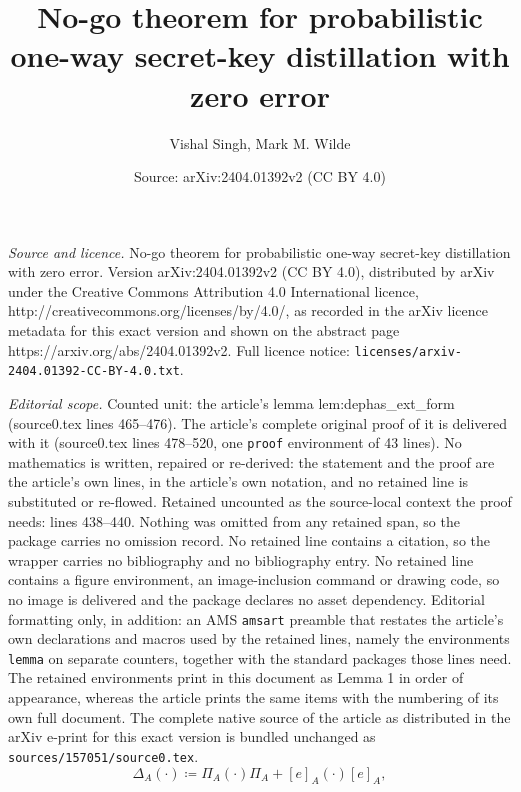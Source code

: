 \documentclass[10pt,a4paper]{amsart}
\title{No-go theorem for probabilistic one-way secret-key distillation with zero error}
\author{Vishal Singh, Mark M. Wilde}
\date{Source: arXiv:2404.01392v2 (CC BY 4.0)}
\begin{document}
\maketitle

\noindent\emph{Source and licence.} No-go theorem for probabilistic one-way secret-key distillation with zero error. Version arXiv:2404.01392v2 (CC BY 4.0), distributed by arXiv under the Creative Commons Attribution 4.0 International licence, http://creativecommons.org/licenses/by/4.0/, as recorded in the arXiv licence metadata for this exact version and shown on the abstract page https://arxiv.org/abs/2404.01392v2. Full licence notice: \texttt{licenses/arxiv-2404.01392-CC-BY-4.0.txt}.\par\smallskip

\noindent\textit{Editorial scope.} Counted unit: the article's lemma lem:dephas\_ext\_form (source0.tex lines 465--476). The article's complete original proof of it is delivered with it (source0.tex lines 478--520, one \texttt{proof} environment of 43 lines). No mathematics is written, repaired or re-derived: the statement and the proof are the article's own lines, in the article's own notation, and no retained line is substituted or re-flowed.  Retained uncounted as the source-local context the proof needs: lines 438--440.  Nothing was omitted from any retained span, so the package carries no omission record.  No retained line contains a citation, so the wrapper carries no bibliography and no bibliography entry.  No retained line contains a figure environment, an image-inclusion command or drawing code, so no image is delivered and the package declares no asset dependency.  Editorial formatting only, in addition: an AMS \texttt{amsart} preamble that restates the article's own declarations and macros used by the retained lines, namely the environments \texttt{lemma} on separate counters, together with the standard packages those lines need.  The retained environments print in this document as Lemma 1 in order of appearance, whereas the article prints the same items with the numbering of its own full document.  The complete native source of the article as distributed in the arXiv e-print for this exact version is bundled unchanged as \texttt{sources/157051/source0.tex}.
\begin{equation}\label{eq:dephas_channel_defn}
        \Delta_{A}\!\left(\cdot\right) \coloneqq \Pi_A\left(\cdot\right)\Pi_A + [e]_A\left(\cdot\right)[e]_A,
\end{equation}
\end{document}
